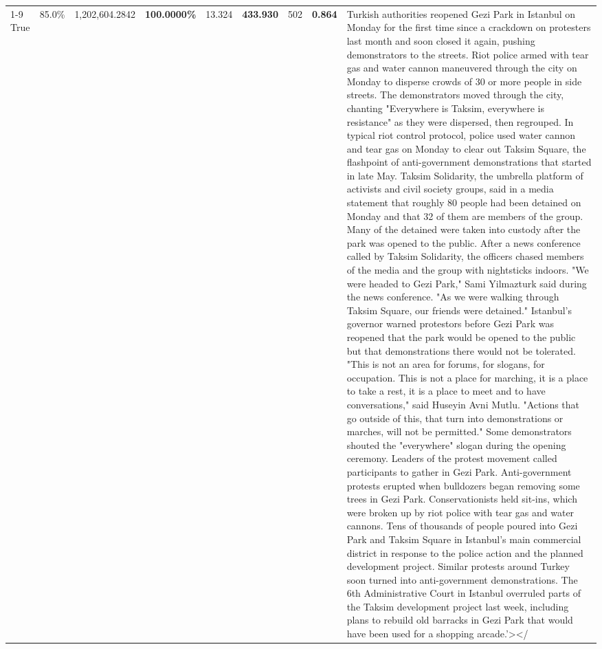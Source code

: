 \begin{table}[H]
\begin{tabular}{lllrlllll}
\cline{1-9}
True & 85.0\% & 1,202,604.2842 & \bfseries \color{red} 100.0000\% & 13.324 & \bfseries \color{red} 433.930 & 502 & \bfseries \color{red} 0.864 & Turkish authorities reopened Gezi Park in Istanbul on Monday for the first time since a crackdown on protesters last month and soon closed it again, pushing demonstrators to the streets. Riot police armed with tear gas and water cannon maneuvered through the city on Monday to disperse crowds of 30 or more people in side streets. The demonstrators moved through the city, chanting "Everywhere is Taksim, everywhere is resistance" as they were dispersed, then regrouped. In typical riot control protocol, police used water cannon and tear gas on Monday to clear out Taksim Square, the flashpoint of anti-government demonstrations that started in late May. Taksim Solidarity, the umbrella platform of activists and civil society groups, said in a media statement that roughly 80 people had been detained on Monday and that 32 of them are members of the group. Many of the detained were taken into custody after the park was opened to the public. After a news conference called by Taksim Solidarity, the officers chased members of the media and the group with nightsticks indoors. "We were headed to Gezi Park," Sami Yilmazturk said during the news conference. "As we were walking through Taksim Square, our friends were detained." Istanbul's governor warned protestors before Gezi Park was reopened that the park would be opened to the public but that demonstrations there would not be tolerated. "This is not an area for forums, for slogans, for occupation. This is not a place for marching, it is a place to take a rest, it is a place to meet and to have conversations," said Huseyin Avni Mutlu. "Actions that go outside of this, that turn into demonstrations or marches, will not be permitted." Some demonstrators shouted the "everywhere" slogan during the opening ceremony. Leaders of the protest movement called participants to gather in Gezi Park. Anti-government protests erupted when bulldozers began removing some trees in Gezi Park. Conservationists held sit-ins, which were broken up by riot police with tear gas and water cannons. Tens of thousands of people poured into Gezi Park and Taksim Square in Istanbul's main commercial district in response to the police action and the planned development project. Similar protests around Turkey soon turned into anti-government demonstrations. The 6th Administrative Court in Istanbul overruled parts of the Taksim development project last week, including plans to rebuild old barracks in Gezi Park that would have been used for a shopping arcade.'></ \\

\end{tabular}
\end{table}
